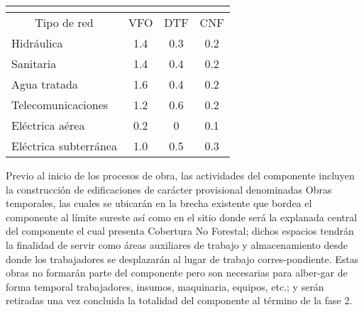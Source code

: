 \documentclass[twoside]{article}
\begin{document}
\begin{multicols}{2}
\begin{tabular}{|c|c|c|c|}
\hline
\multicolumn{4}{|l|}{\cellcolor{myblue1}\footnotesize\color{white}{ Longitudes de infraestructura a implementar por categoría del POEL (km)}}\\
\hline
\multicolumn{1}{|c|}{\textcolor{myblue2} {Tipo de red}} & \textcolor{myblue2} {VFO} & \textcolor{myblue2} {DTF} & \textcolor{myblue2} {CNF}\\
\hline
\multicolumn{1}{|l|}{Hidráulica} & 1.4 & 0.3 & 0.2\\
\hline
\multicolumn{1}{|l|}{Sanitaria} & 1.4 & 0.4 & 0.2\\
\hline
\multicolumn{1}{|l|}{Agua tratada} & 1.6 & 0.4 & 0.2\\
\hline
\multicolumn{1}{|l|}{Telecomunicaciones} & 1.2 & 0.6 & 0.2\\
\hline
\multicolumn{1}{|l|}{Eléctrica aérea} & 0.2 & 0 & 0.1\\
\hline
\multicolumn{1}{|l|}{Eléctrica subterránea} & 1.0 & 0.5 & 0.3\\
\hline
\end{tabular}

\bigskip

Previo al inicio de los procesos de obra, las actividades del componente incluyen la construcción de edificaciones de carácter provisional denominadas Obras temporales, las cuales se ubicarán en la brecha existente que bordea el componente al límite sureste así como en el sitio donde será la explanada central del componente el cual presenta Cobertura No Forestal; dichos espacios tendrán la finalidad de servir como áreas auxiliares de trabajo y almacenamiento desde donde los trabajadores se desplazarán al lugar de trabajo corres-pondiente. Estas obras no formarán parte del componente pero son necesarias para alber-gar de forma temporal trabajadores, insumos, maquinaria, equipos, etc.; y serán retiradas una vez concluida la totalidad del componente al término de la fase 2.
\end{multicols}
\end{document}
